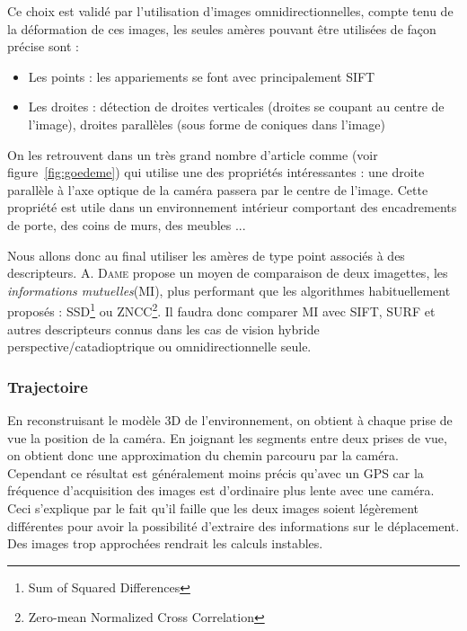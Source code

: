 Ce choix est validé par l'utilisation d'images omnidirectionnelles, compte tenu de la déformation de ces images, les seules amères pouvant être utilisées de façon précise sont :
\begin{itemize}
\item Les points : les appariements se font avec principalement SIFT
\item Les droites : détection de droites verticales (droites se coupant au centre de l'image), droites parallèles (sous forme de coniques dans l'image)
\end{itemize}
On les retrouvent dans un très grand nombre d'article comme \cite{Goedeme07} (voir figure~\ref{fig:goedeme}) qui utilise une des propriétés intéressantes : une droite parallèle à l'axe optique de la caméra passera par le centre de l'image.
Cette propriété est utile dans un environnement intérieur comportant des encadrements de porte, des coins de murs, des meubles ...

Nous allons donc au final utiliser les amères de type point associés à des descripteurs.
A. \textsc{Dame} \cite{Dame10PhD} propose un moyen de comparaison de deux imagettes, les \emph{informations mutuelles}(MI), plus performant que les algorithmes habituellement proposés : SSD\footnote{Sum of Squared Differences} ou ZNCC\footnote{Zero-mean Normalized Cross Correlation}.
Il faudra donc comparer MI avec SIFT, SURF et autres descripteurs connus dans les cas de vision hybride perspective/catadioptrique ou omnidirectionnelle seule.  

\subsubsection{Trajectoire}

En reconstruisant le modèle 3D de l'environnement, on obtient à chaque prise de vue la position de la caméra.
En joignant les segments entre deux prises de vue, on obtient donc une approximation du chemin parcouru par la caméra.
Cependant ce résultat est généralement moins précis qu'avec un GPS car la fréquence d'acquisition des images est d'ordinaire plus lente avec une caméra.
Ceci s'explique par le fait qu'il faille que les deux images soient légèrement différentes pour avoir la possibilité d'extraire des informations sur le déplacement.
Des images trop approchées rendrait les calculs instables.

